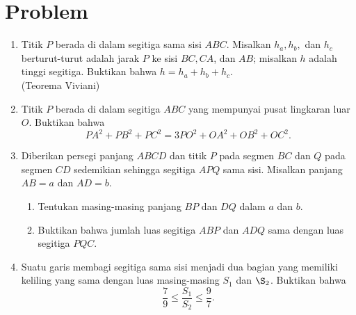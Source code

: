 \documentclass[12pt]{article}
\begin{document}
\section*{Problem}
	\begin{enumerate}
		\item Titik $P$ berada di dalam segitiga sama sisi $ABC$. Misalkan $h_a,h_b,$ dan $h_c$ berturut-turut adalah jarak $P$ ke sisi $BC,CA$, dan $AB$; misalkan $h$ adalah tinggi segitiga. Buktikan bahwa $h=h_a+h_b+h_c$. \\
		\hfill (Teorema Viviani)

		\item Titik $P$ berada di dalam segitiga $ABC$ yang mempunyai pusat lingkaran luar $O$. Buktikan bahwa 
		$$ PA^2 + PB^2 + PC^2 = 3PO^2 + OA^2 + OB^2 + OC^2. $$
		\item Diberikan persegi panjang $ABCD$ dan titik $P$ pada segmen $BC$ dan $Q$ pada segmen $CD$ sedemikian sehingga segitiga $APQ$ sama sisi. Misalkan panjang $AB=a$ dan $AD=b$. 
		\begin{enumerate}
			\item Tentukan masing-masing panjang $BP$ dan $DQ$ dalam $a$ dan $b$. 
			\item Buktikan bahwa jumlah luas segitiga $ABP$ dan $ADQ$ sama dengan luas segitiga $PQC$. 
		\end{enumerate}
		\item Suatu garis membagi segitiga sama sisi menjadi dua bagian yang memiliki keliling yang sama dengan luas masing-masing $S_1$ dan $\S_2$. Buktikan bahwa 
			$$ \frac{7}{9} \leq \frac{S_1}{S_2} \leq \frac{9}{7}. $$

	\end{enumerate}


\end{document}
